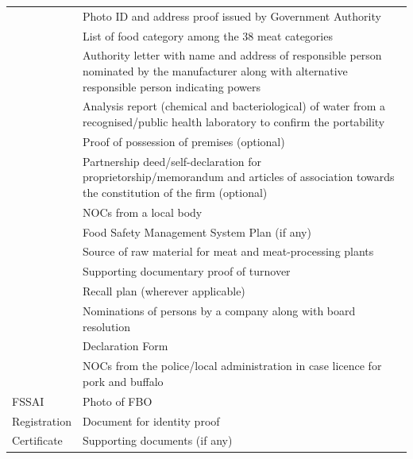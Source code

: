 \documentclass[a4paper, 12pt]{article}
\begin{document}
\begin{longtable}{>{\raggedright}p{2.5cm}>{\raggedright\arraybackslash}p{13cm}}
    \multicolumn{1}{r}{} & Photo ID and address proof issued by Government Authority \\
    \multicolumn{1}{r}{} & List of food category among the 38 meat categories \\
    \multicolumn{1}{r}{} & Authority letter with name and address of responsible person nominated by the manufacturer along with alternative responsible person indicating powers   \\
    \multicolumn{1}{r}{} & Analysis report (chemical and bacteriological) of water from a recognised/public health laboratory to confirm the portability \\
    \multicolumn{1}{r}{} & Proof of possession of premises (optional) \\
    \multicolumn{1}{r}{} & Partnership deed/self-declaration for proprietorship/memorandum and articles of association towards the constitution of the firm (optional) \\
    \multicolumn{1}{r}{} & NOCs from a local body \\
    \multicolumn{1}{r}{} & Food Safety Management System Plan (if any) \\
    \multicolumn{1}{r}{} & Source of raw material for meat and meat-processing plants \\
    \multicolumn{1}{r}{} & Supporting documentary proof of turnover \\
    \multicolumn{1}{r}{} & Recall plan (wherever applicable) \\
    \multicolumn{1}{r}{} & Nominations of persons by a company along with board resolution \\
    \multicolumn{1}{r}{} & Declaration Form \\
    \multicolumn{1}{r}{} & NOCs from the police/local administration in case licence for pork and buffalo  \\
    \midrule
    FSSAI   & Photo of FBO \\
    Registration & Document for identity proof \\
    Certificate & Supporting documents (if any) \\
    \bottomrule
    \end{longtable}%
  \label{tab:addlabel}%
\normalsize  
  
\newpage
\small


\newpage
\end{document}
